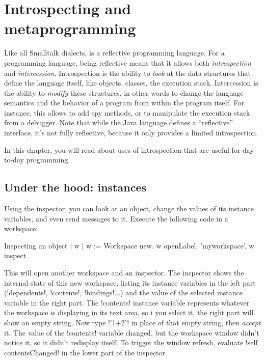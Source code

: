 \documentclass[a4paper,10pt,twoside]{book}
\begin{document}
	\renewcommand{\nnbb}[2]{} %
	\sloppy
\fi
\chapter{Introspecting and metaprogramming}\label{cha:metaprog}

Like all Smalltalk dialects, \sq is a reflective programming language.
For a programming language, being reflective means that it allows both \emph{introspection} and \emph{intercession}.
Introspection is the ability to \emph{look} at the data structures that define the language itself, like objects, classes, the execution stack.
Intercession is the ability to \emph{modify} these structures, in other words to change the language semantics and the behavior of a program from within the program itself.
For instance, this allows to add spy methods, or to manipulate the execution stack from a debugger.
Note that while the Java language defines a ``reflective'' interface, it's not fully reflective, because it only provides a limited introspection.

In this chapter, you will read about uses of introspection that are useful for day-to-day programming.


\section{Under the hood: instances} %

Using the inspector, you can look at an object, change the values of its instance variables, and even send messages to it. Execute the following code in a workspace:
\begin{script}[inspectobject]{Inspecting an object}
| w |
w := Workspace new.
w openLabel: 'myworkspace'.
w inspect
\end{script}

This will open another workspace and an inspector.
The inspector shows the internal state of this new workspace, listing its instance variables in the left part (\ct!dependents!, \ct!contents!, \ct!bindings!...) and the value of the selected instance variable in the right part.
The \ct!contents! instance variable represents whatever the workspace is displaying in its text area, so i you select it, the right part will show an empty string.
Now type \ct!'1+2'! in place of that empty string, then \emph{accept} it.
The value of the \ct!contents! variable changed, but the workspace window didn't notice it, so it didn't redisplay itself.
To trigger the window refresh, evaluate \ct!self contentsChanged! in the lower part of the inspector. 
\end{document}
